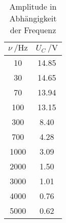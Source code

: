 \begin{table}[H]
  \centering
  \caption{Amplitude in Abhängigkeit der Frequenz}
  \label{tab:tabe2}
    \begin{tabular}{c c}
    \toprule
    $ \nu \: / \si{\hertz} $ & $ U_C \: / \si {\volt} $ \\
    \midrule
    10 & 14.85 \\
    30 & 14.65 \\
    70 & 13.94 \\
    100 & 13.15 \\
    300 & 8.40 \\
    700 & 4.28 \\
    1000 & 3.09 \\
    2000 & 1.50 \\
    3000 & 1.01 \\
    4000 & 0.76 \\
    5000 & 0.62 \\

    \bottomrule
    \end{tabular}
\end{table}
